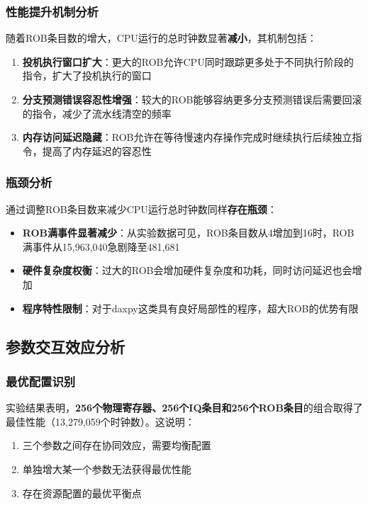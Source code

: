 \documentclass[a4paper]{article}
\begin{document}
\subsubsection{性能提升机制分析}

随着ROB条目数的增大，CPU运行的总时钟数显著\textbf{减小}，其机制包括：

\begin{enumerate}
    \item \textbf{投机执行窗口扩大}：更大的ROB允许CPU同时跟踪更多处于不同执行阶段的指令，扩大了投机执行的窗口
    \item \textbf{分支预测错误容忍性增强}：较大的ROB能够容纳更多分支预测错误后需要回滚的指令，减少了流水线清空的频率
    \item \textbf{内存访问延迟隐藏}：ROB允许在等待慢速内存操作完成时继续执行后续独立指令，提高了内存延迟的容忍性
\end{enumerate}

\subsubsection{瓶颈分析}

通过调整ROB条目数来减少CPU运行总时钟数同样\textbf{存在瓶颈}：

\begin{itemize}
    \item \textbf{ROB满事件显著减少}：从实验数据可见，ROB条目数从4增加到16时，ROB满事件从15,963,040急剧降至481,681
    \item \textbf{硬件复杂度权衡}：过大的ROB会增加硬件复杂度和功耗，同时访问延迟也会增加
    \item \textbf{程序特性限制}：对于daxpy这类具有良好局部性的程序，超大ROB的优势有限
\end{itemize}

\subsection{参数交互效应分析}

\subsubsection{最优配置识别}

实验结果表明，\textbf{256个物理寄存器、256个IQ条目和256个ROB条目}的组合取得了最佳性能（13,279,059个时钟数）。这说明：

\begin{enumerate}
    \item 三个参数之间存在协同效应，需要均衡配置
    \item 单独增大某一个参数无法获得最优性能
    \item 存在资源配置的最优平衡点
\end{enumerate}
\end{document}
